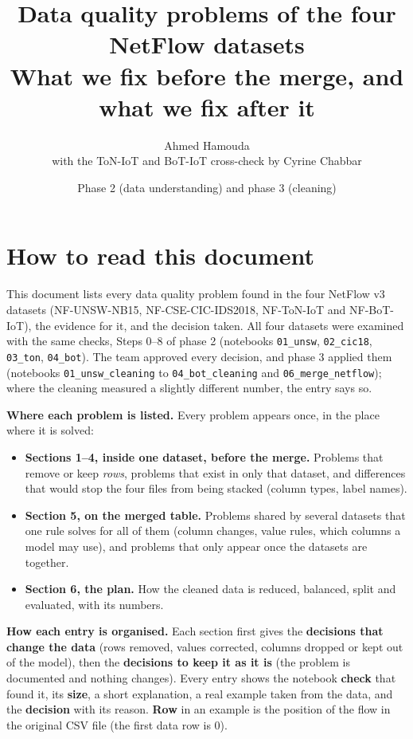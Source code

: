 \documentclass[10pt,a4paper]{article}
\title{Data quality problems of the four NetFlow datasets\\[2pt]\large What we fix before the merge, and what we fix after it}
\author{Ahmed Hamouda \\ \small with the ToN-IoT and BoT-IoT cross-check by Cyrine Chabbar}
\date{Phase 2 (data understanding) and phase 3 (cleaning)}
\begin{document}
\maketitle

\section*{How to read this document}
This document lists every data quality problem found in the four NetFlow v3 datasets (NF-UNSW-NB15,
NF-CSE-CIC-IDS2018, NF-ToN-IoT and NF-BoT-IoT), the evidence for it, and the decision taken. All four datasets were
examined with the same checks, Steps 0--8 of phase 2 (notebooks \texttt{01\_unsw}, \texttt{02\_cic18}, \texttt{03\_ton},
\texttt{04\_bot}). The team approved every decision, and phase 3 applied them (notebooks \texttt{01\_unsw\_cleaning} to
\texttt{04\_bot\_cleaning} and \texttt{06\_merge\_netflow}); where the cleaning measured a slightly different number,
the entry says so.

\textbf{Where each problem is listed.} Every problem appears once, in the place where it is solved:
\begin{itemize}
\item \textbf{Sections 1--4, inside one dataset, before the merge.} Problems that remove or keep \emph{rows}, problems that
exist in only that dataset, and differences that would stop the four files from being stacked (column types, label names).
\item \textbf{Section 5, on the merged table.} Problems shared by several datasets that one rule solves for all of them
(column changes, value rules, which columns a model may use), and problems that only appear once the datasets are together.
\item \textbf{Section 6, the plan.} How the cleaned data is reduced, balanced, split and evaluated, with its numbers.
\end{itemize}

\textbf{How each entry is organised.} Each section first gives the \textbf{decisions that change the data} (rows removed,
values corrected, columns dropped or kept out of the model), then the \textbf{decisions to keep it as it is} (the problem
is documented and nothing changes). Every entry shows the notebook \textbf{check} that found it, its \textbf{size}, a short
explanation, a real example taken from the data, and the \textbf{decision} with its reason. \textbf{Row} in an example is
the position of the flow in the original CSV file (the first data row is 0).
\end{document}
